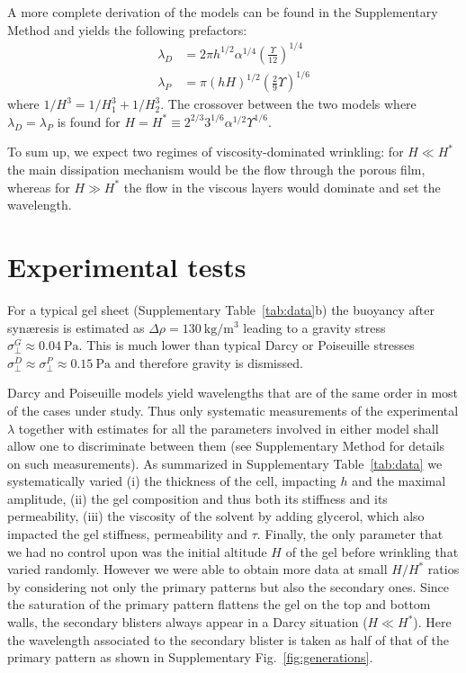 \documentclass[twocolumn,superscriptaddress,showpacs,preprintnumbers,
amsmath,amssymb,prl]{revtex4-1}
\begin{document}
A more complete derivation of the models can be found in the Supplementary Method and yields the following prefactors:
\begin{align}
\lambda_D &= 2\pi h^{1/2}\alpha^{1/4}\left(\frac{\Upsilon}{12}\right)^{1/4}\\
\lambda_P &= \pi (hH)^{1/2}\left(\frac{2}{9}\Upsilon\right)^{1/6}
\end{align}
where $1/H^3 = 1/H_1^3 + 1/H_2^3$. The crossover between the two models where $\lambda_D=\lambda_P$ is found for $H = H^* \equiv 2^{2/3} 3^{1/6} \alpha^{1/2} \Upsilon^{1/6}$.

To sum up, we expect two regimes of viscosity-dominated wrinkling: for $H\ll H^*$ the main dissipation mechanism would be the flow through the porous film, whereas for $H\gg H^*$ the flow in the viscous layers would dominate and set the wavelength.

\section*{Experimental tests}

For a typical gel sheet (Supplementary Table~\ref{tab:data}b) the buoyancy after syn\ae{}resis is estimated as $\Delta\rho=\SI{130}{\kilo\gram\per\cubic\metre}$ leading to a gravity stress $\sigma_\perp^G \approx \SI{0.04}{\pascal}$. This is much lower than typical Darcy or Poiseuille stresses $\sigma_\perp^D \approx \sigma_\perp^P \approx \SI{0.15}{\pascal}$ and therefore gravity is dismissed.


Darcy and Poiseuille models yield wavelengths that are of the same order in most of the cases under study. Thus only systematic measurements of the experimental $\lambda$ together with estimates for all the parameters involved in either model shall allow one to discriminate between them (see Supplementary Method for details on such measurements). As summarized in Supplementary Table~\ref{tab:data} we systematically varied (i) the thickness of the cell, impacting $h$ and the maximal amplitude, (ii) the gel composition and thus both its stiffness and its permeability, (iii) the viscosity of the solvent by adding glycerol, which also impacted the gel stiffness, permeability and $\tau$. Finally, the only parameter that we had no control upon was the initial altitude $H$ of the gel before wrinkling that varied randomly. However we were able to obtain more data at small $H/H^*$ ratios by considering not only the primary patterns but also the secondary ones. Since the saturation of the primary pattern flattens the gel on the top and bottom walls, the secondary blisters always appear in a Darcy situation ($H\ll H^*$). Here the wavelength associated to the secondary blister is taken as half of that of the primary pattern as shown in Supplementary Fig.~\ref{fig:generations}.
\end{document}
